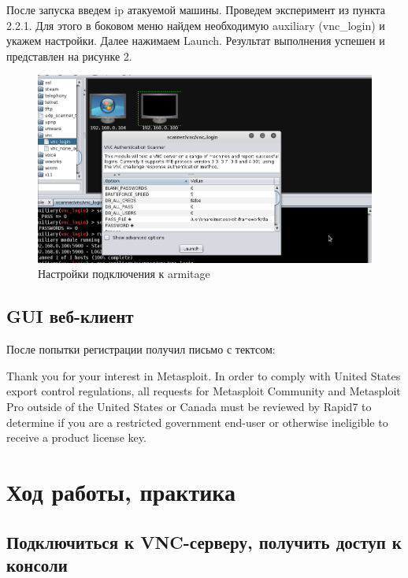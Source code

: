 \documentclass[11pt, a4paper]{article}		%
\begin{document}
После запуска введем ip атакуемой машины. Проведем эксперимент из пункта 2.2.1. Для этого в боковом меню найдем необходимую auxiliary (vnc\_login) и укажем настройки. Далее нажимаем Launch. Результат выполнения успешен и представлен на рисунке 2.


\begin{figure}[h!]
\centering
\includegraphics[scale=0.8]{res/meta}
\caption{Настройки подключения к armitage}
\end{figure}


\subsection{GUI веб-клиент}

После попытки регистрации получил письмо с тектсом:

Thank you for your interest in Metasploit. In order to comply with United States export control regulations, all requests for Metasploit Community and Metasploit Pro outside of the United States or Canada must be reviewed by Rapid7 to determine if you are a restricted government end-user or otherwise ineligible to receive a product license key.


\section{Ход работы, практика}


\subsection{Подключиться к VNC-серверу, получить доступ к консоли}
\end{document}
